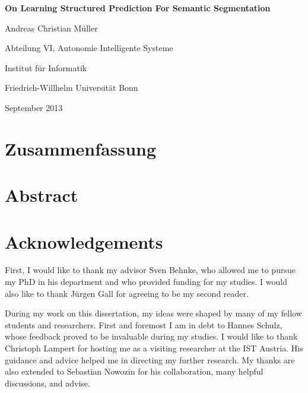 \documentclass[12pt,toc=bibnumbered, a4paper,twoside,DIV=calc]{scrbook}
\begin{document}
\begin{spacing}{1}
\begin{titlepage}
\begin{center}
\vspace*{1in}
\textbf{{\LARGE On Learning Structured Prediction For Semantic Segmentation}}
\par
\vspace{1.5in} {\large Andreas Christian M\"uller}
\par \vspace{0.5in}
Abteilung VI, Autonomie Intelligente Systeme \par
Institut f\"ur Informatik
\par \vspace{0.5in}
Friedrich-Willhelm Universit\"at Bonn \par
\vspace{0.5in} September 2013 \end{center}

\end{titlepage}


\tableofcontents
\end{spacing}
\chapter*{Zusammenfassung}
\chapter*{Abstract}

\chapter*{Acknowledgements}
First, I would like to thank my advisor Sven Behnke, who allowed me
to pursue my PhD in his department and who provided funding for my studies.
I would also like to thank J\"urgen Gall for agreeing to be my second reader.

During my work on this dissertation, my ideas were shaped by many of my fellow
students and researchers. First and foremost I am in debt to Hannes Schulz,
whose feedback proved to be invaluable during my studies.
I would like to thank Christoph Lampert for hosting me as a visiting researcher
at the IST Austria. His guidance and advice helped me in directing my further
research. My thanks are also extended to Sebastian Nowozin for his collaboration,
many helpful discussions, and advise.
\end{document}
